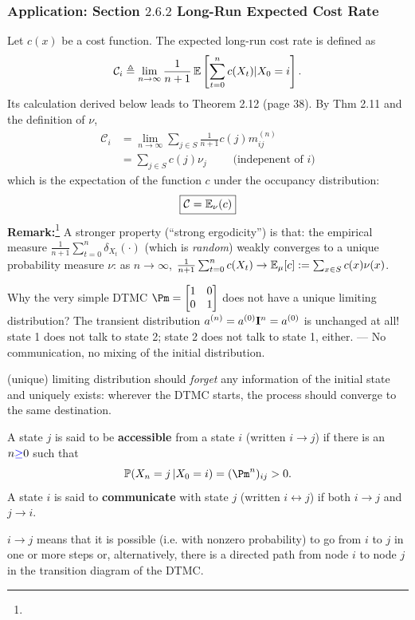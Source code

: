 \documentclass[english,10pt]{beamer}
\begin{document}
\begin{frame}
\frametitle
{Application:  Section $2.6.2$ Long-Run Expected Cost Rate  }

Let $c(x)$ be a cost function. The expected long-run cost rate is defined as 
\[  \mathcal{C}_i  \triangleq \lim_{n\to\infty}\frac{1}{n+1}\operatorname{\mathbb E} \left[ \sum_{t=0}^nc(X_t)\vert X_0=i\right]. \]
Its calculation derived below leads to  Theorem 2.12 (page 38). By  Thm 2.11 and the definition of $\nu$,
\[
\begin{split}
\mathcal{C}_i &=\lim_{n\to\infty} \sum_{j\in S} \frac{1}{n+1} c(j) m^{(n)}_{ij}   
\\
&= \sum_{j\in S}c(j) \nu_j \qquad  \mbox{       (indepenent of } i )
\end{split}
\]
which is the expectation of the   function $c$ under the occupancy distribution: 
\[\boxed{ \mathcal{C} = \operatorname{\mathbb E}_{\nu} (c)}\]
{\bf Remark:}\footnote{\optional}
A stronger property (``strong ergodicity'') is that:
the empirical measure 
$ \frac{1}{n+1}\sum_{t=0}^{n} \delta_{X_t}(\cdot) $
(which is {\it random})
weakly 
converges to a unique  probability measure $\nu$: as $n\to \infty$,
$\frac{1}{n+1}\sum_{t=0}^{n} c({X_t})\to   \operatorname{\mathbb E}_{\mu}[c] := \sum_{x\in S }c(x) \nu(x)$.
\end{frame}


 \begin{frame}
\biz[<+->]
\item
Why the very simple DTMC  $\Pm=\begin{bmatrix} 1 & 0 \\
0 & 1 \end{bmatrix}$ does not have a unique limiting distribution?
The transient distribution $a^{(n)}=a^{(0)} {\mathbf{I}}^n=a^{(0)}$ is unchanged at all! 
 state 1 does not talk to state 2; state 2 does not talk to state 1, either.  --- 
No communication, no mixing of the initial distribution.
 \item (unique) limiting distribution should  {\emph {forget}} any information of the initial state
and uniquely exists: 
wherever the DTMC starts,  the process should converge to the same destination.
\eiz
\pause
\begin{definition}
A state $j$ is said to be {\bf accessible} from a state $i$ (written $i\rightarrow j$)  if 
there is an  $n {\color{blue}\geq} 0$ such that 
\vspace{-2pt}
\[
\p(X_{n}=j\,\vert X_{0}=i)=(\Pm^n)_{ij}>0.
\]
A state $ i$ is said to {\bf communicate} with state $j$ (written $ i \leftrightarrow j$) if both  $i \rightarrow j$ and $j \rightarrow i$.
\end{definition}
\par
$i\rightarrow j$ means that 
it is possible (i.e. with nonzero probability) to go from     $i$ to    $ j$   in one or more steps or, alternatively, there is a directed path from   node $i$ to   node $j$ in the transition diagram of the DTMC. \par
  

\end{frame}
\end{document}
